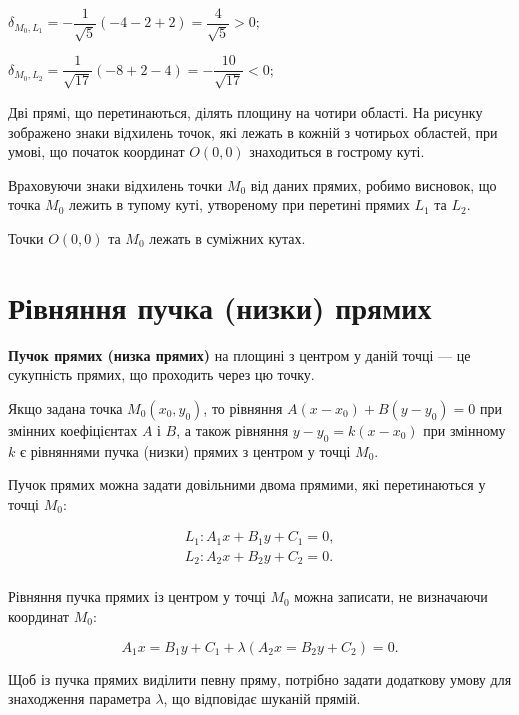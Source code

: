 \begin{solution}
{}
	\parbox{\textwidth - 2.5cm}{
		$\delta_{M_0,L_1} = -\dfrac{1}{\sqrt{5}}(-4 -2 +2) = \dfrac{4}{\sqrt{5}} > 0;$
	
		$\delta_{M_0,L_2} = \dfrac{1}{\sqrt{17}}(-8 +2 -4) = -\dfrac{10}{\sqrt{17}} < 0;$
	
		Дві прямі, що перетинаються, ділять площину на
		чотири області. На рисунку зображено знаки відхилень
		точок, які лежать в кожній з чотирьох областей, при умові, що початок координат
		$O(0,0)$ знаходиться в гострому куті.
	}
	
	Враховуючи знаки відхилень точки $M_0$ від даних прямих, робимо висновок,
	що точка $M_0$ лежить в тупому куті, утвореному при перетині прямих $L_1$ та $L_2$.
	
	Точки $O(0,0)$ та $M_0$ лежать в суміжних кутах. 
\end{solution}

\section{Рівняння пучка (низки) прямих}

\begin{definition}
	\textbf{Пучок прямих (низка прямих)} на площині з центром у даній точці --- це  
	сукупність прямих, що проходить через цю точку.
\end{definition}

Якщо задана точка $M_0(x_0,y_0)$, то рівняння $A(x - x_0) + B(y - y_0) = 0$ при
змінних коефіцієнтах $A$ і $B$, а також рівняння $y-y_0 = k(x-x_0)$ при змінному $k$
є рівняннями пучка (низки) прямих з центром у точці $M_0$.

Пучок прямих можна задати довільними двома прямими, які перетинаються у
точці $M_0$:

$$\begin{array}{l}
	L_1: A_1x + B_1y + C_1 = 0,\\
	L_2: A_2x + B_2y + C_2 = 0.\\
\end{array}$$

Рівняння пучка прямих із центром у точці $M_0$ можна записати, не визначаючи
координат $M_0$:

$$A_1x = B_1y + C_1 + \lambda(A_2x = B_2y + C_2) = 0.$$

Щоб із пучка прямих виділити певну пряму, потрібно задати додаткову умову
для знаходження параметра $\lambda$, що відповідає шуканій прямій. 

